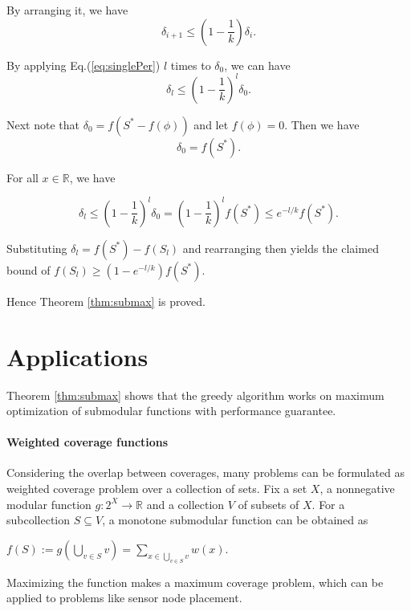 \documentclass[12pt]{article}
\begin{document}
By arranging it, we have
\begin{equation}
\label{eq:singlePer}
\delta_{i+1} \leq (1 - \frac{1}{k})\delta_{i}.
\end{equation}

By applying Eq.(\ref{eq:singlePer}) $ l $ times to $ \delta_{0} $, we can have
\begin{equation}
\delta_{l} \leq (1-\frac{1}{k})^{l}\delta_{0}.
\end{equation}

Next note that $ \delta_{0} = f(S^{*} - f(\phi)) $ and let $ f(\phi) = 0 $. Then we have
\begin{equation}
\delta_{0} = f(S^{*}).
\end{equation}

For all $ x \in \mathbb{R} $, we have

\begin{equation}
\delta_{l} \leq (1 - \frac{1}{k})^{l} \delta_{0} = (1 - \frac{1}{k})^{l} f(S^{*}) \leq e^{- l/k} f(S^{*}).
\end{equation}

Substituting $ \delta_{l} = f(S^{*}) - f(S_{l}) $ and rearranging then yields the claimed bound of $ f(S_{l}) \geq (1-e^{-l/k})f(S^{*}) $.

Hence Theorem \ref{thm:submax} is proved.

\section{Applications}

Theorem \ref{thm:submax} shows that the greedy algorithm works on maximum optimization of submodular functions with performance guarantee.

\paragraph{\textbf{Weighted coverage functions}} Considering the overlap between coverages, many problems can be formulated as weighted coverage problem over a collection of sets. Fix a set $ X $, a nonnegative modular function $ g : 2^{X} \rightarrow \mathbb{R} $ and a collection $ V $ of subsets of $ X $. For a subcollection $ S \subseteq V $, a monotone submodular function can be obtained as \\
\begin{center}
$ f(S) := g(\bigcup_{v \in S} v) = \sum_{x \in \bigcup_{v \in S} v} w(x) $.
\end{center}
Maximizing the function makes a maximum coverage problem, which can be applied to problems like sensor node placement.
\end{document}
